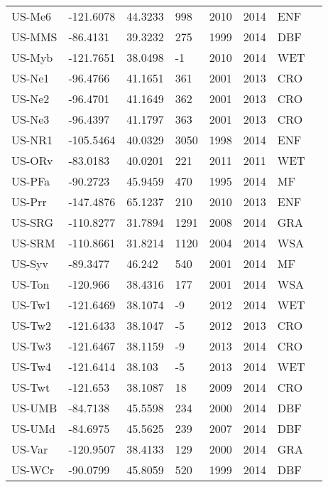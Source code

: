 \documentclass[a4paper, 12pt]{article}
\begin{document}
\begin{longtable}{l l l l l l l l}
US-Me6 & -121.6078 & 44.3233 & 998 & 2010 & 2014 & ENF & \cite{US-Me6} \\ 
US-MMS & -86.4131 & 39.3232 & 275 & 1999 & 2014 & DBF & \cite{US-MMS} \\ 
US-Myb & -121.7651 & 38.0498 & -1 & 2010 & 2014 & WET & \cite{US-Myb} \\ 
US-Ne1 & -96.4766 & 41.1651 & 361 & 2001 & 2013 & CRO & \cite{US-Ne1} \\ 
US-Ne2 & -96.4701 & 41.1649 & 362 & 2001 & 2013 & CRO & \cite{US-Ne2} \\ 
US-Ne3 & -96.4397 & 41.1797 & 363 & 2001 & 2013 & CRO & \cite{US-Ne3} \\ 
US-NR1 & -105.5464 & 40.0329 & 3050 & 1998 & 2014 & ENF & \cite{US-NR1} \\ 
US-ORv & -83.0183 & 40.0201 & 221 & 2011 & 2011 & WET & \cite{US-ORv} \\ 
US-PFa & -90.2723 & 45.9459 & 470 & 1995 & 2014 & MF & \cite{US-PFa} \\ 
US-Prr & -147.4876 & 65.1237 & 210 & 2010 & 2013 & ENF & \cite{US-Prr} \\ 
US-SRG & -110.8277 & 31.7894 & 1291 & 2008 & 2014 & GRA & \cite{US-SRG} \\ 
US-SRM & -110.8661 & 31.8214 & 1120 & 2004 & 2014 & WSA & \cite{US-SRM} \\ 
US-Syv & -89.3477 & 46.242 & 540 & 2001 & 2014 & MF & \cite{US-Syv} \\ 
US-Ton & -120.966 & 38.4316 & 177 & 2001 & 2014 & WSA & \cite{US-Ton} \\ 
US-Tw1 & -121.6469 & 38.1074 & -9 & 2012 & 2014 & WET & \cite{US-Tw1} \\ 
US-Tw2 & -121.6433 & 38.1047 & -5 & 2012 & 2013 & CRO & \cite{US-Tw2} \\ 
US-Tw3 & -121.6467 & 38.1159 & -9 & 2013 & 2014 & CRO & \cite{US-Tw3} \\ 
US-Tw4 & -121.6414 & 38.103 & -5 & 2013 & 2014 & WET & \cite{US-Tw4} \\ 
US-Twt & -121.653 & 38.1087 & 18 & 2009 & 2014 & CRO & \cite{US-Twt} \\ 
US-UMB & -84.7138 & 45.5598 & 234 & 2000 & 2014 & DBF & \cite{US-UMB} \\ 
US-UMd & -84.6975 & 45.5625 & 239 & 2007 & 2014 & DBF & \cite{US-UMd} \\ 
US-Var & -120.9507 & 38.4133 & 129 & 2000 & 2014 & GRA & \cite{US-Var} \\ 
US-WCr & -90.0799 & 45.8059 & 520 & 1999 & 2014 & DBF & \cite{US-WCr} \\ 

\end{longtable}
\end{document}
